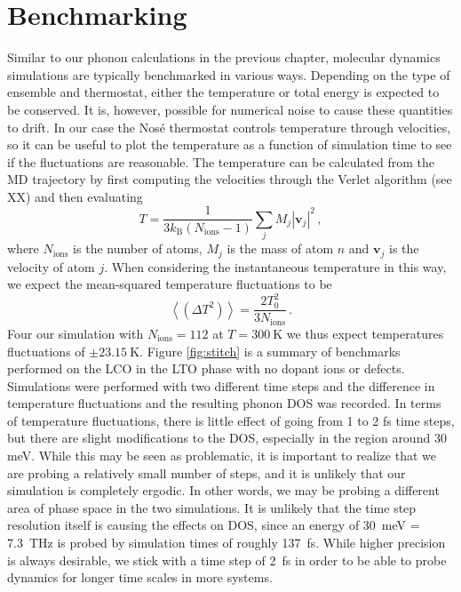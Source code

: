 \section{Benchmarking}
Similar to our phonon calculations in the previous chapter, molecular dynamics simulations are typically benchmarked in various ways. Depending on the type of ensemble and thermostat, either the temperature or total energy is expected to be conserved. It is, however, possible for numerical noise to cause these quantities to drift. In our case the Nos\'{e} thermostat controls temperature through velocities, so it can be useful to plot the temperature as a function of simulation time to see if the fluctuations are reasonable. The temperature can be calculated from the MD trajectory by first computing the velocities through the Verlet algorithm (see XX) and then evaluating
%
\[ T = \frac{1}{3 k_\text{B} (N_\text{ions}-1)} \sum_j M_j |\bm{v}_j|^2 \, , \]
%
where $N_\text{ions}$ is the number of atoms, $M_j$ is the mass of atom $n$ and $\bm{v}_j$ is the velocity of atom $j$. When considering the instantaneous temperature in this way, we expect the mean-squared temperature fluctuations to be \cite{Hickman2016}
%
\[ \left\langle \left( \Delta T^2 \right) \right\rangle = \frac{2T_0^2}{3N_\text{ions}} \, . \]
%
Four our simulation with $N_\text{ions} = 112$ at $T = \SI{300}{\kelvin}$ we thus expect temperatures fluctuations of $\pm \SI{23.15}{\kelvin}$. Figure \ref{fig:stitch} is a summary of benchmarks performed on the LCO in the LTO phase with no dopant ions or defects. Simulations were performed with two different time steps and the difference in temperature fluctuations and the resulting phonon DOS was recorded. In terms of temperature fluctuations, there is little effect of going from 1 to 2 fs time steps, but there are slight modifications to the DOS, especially in the region around 30 meV. While this may be seen as problematic, it is important to realize that we are probing a relatively small number of steps, and it is unlikely that our simulation is completely ergodic. In other words, we may be probing a different area of phase space in the two simulations. It is unlikely that the time step resolution itself is causing the effects on DOS, since an energy of \SI{30}{\milli\eV} = \SI{7.3}{\tera\hertz} is probed by simulation times of roughly \SI{137}{\femto\second}. While higher precision is always desirable, we stick with a time step of \SI{2}{\femto\second} in order to be able to probe dynamics for longer time scales in more systems.

